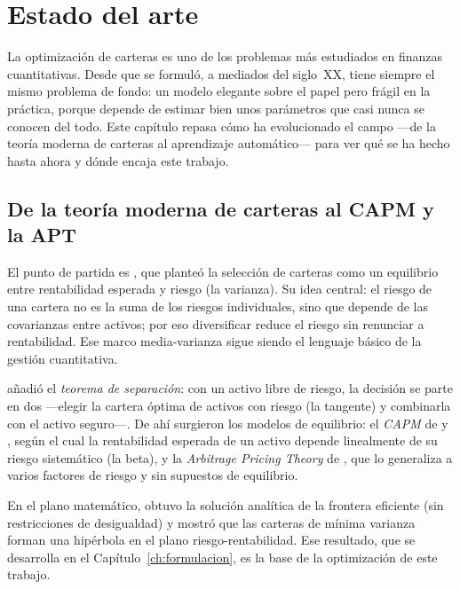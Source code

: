 \chapter{Estado del arte}
\label{ch:estado-arte}

La optimización de carteras es uno de los problemas más estudiados en finanzas
cuantitativas. Desde que se formuló, a mediados del siglo~XX, tiene siempre el
mismo problema de fondo: un modelo elegante sobre el papel pero frágil en la
práctica, porque depende de estimar bien unos parámetros que casi nunca se
conocen del todo. Este capítulo repasa cómo ha evolucionado el campo ---de la
teoría moderna de carteras al aprendizaje automático--- para ver qué se ha
hecho hasta ahora y dónde encaja este trabajo.

\section{De la teoría moderna de carteras al CAPM y la APT}

El punto de partida es \citet{Markowitz1952}, que planteó la selección de
carteras como un equilibrio entre rentabilidad esperada y riesgo (la varianza).
Su idea central: el riesgo de una cartera no es la suma de los riesgos
individuales, sino que depende de las covarianzas entre activos; por eso
diversificar reduce el riesgo sin renunciar a rentabilidad. Ese marco
media-varianza sigue siendo el lenguaje básico de la gestión cuantitativa.

\citet{Tobin1958} añadió el \textit{teorema de separación}: con un activo libre
de riesgo, la decisión se parte en dos ---elegir la cartera óptima de activos
con riesgo (la tangente) y combinarla con el activo seguro---. De ahí surgieron
los modelos de equilibrio: el \textit{CAPM} de \citet{Sharpe1964} y
\citet{Lintner1965}, según el cual la rentabilidad esperada de un activo depende
linealmente de su riesgo sistemático (la beta), y la \textit{Arbitrage Pricing
Theory} de \citet{Ross1976}, que lo generaliza a varios factores de riesgo y sin
supuestos de equilibrio.

En el plano matemático, \citet{Merton1972} obtuvo la solución analítica de la
frontera eficiente (sin restricciones de desigualdad) y mostró que las carteras
de mínima varianza forman una hipérbola en el plano riesgo-rentabilidad. Ese
resultado, que se desarrolla en el Capítulo~\ref{ch:formulacion}, es la base de
la optimización de este trabajo.

